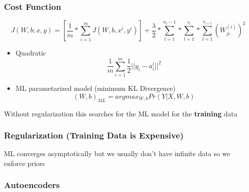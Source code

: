 \documentclass{beamer}
\begin{document}
\begin{frame}[fragile]
\frametitle{Cost Function}
	\begin{tiny}
		\begin{equation}
			J(W,b;x,y) = [\frac{1}{m}*\sum_{i=1}^{m} J(W,b,x^i,y^i)] + \frac{\lambda}{2}*\sum_{l=1}^{n_l-1}*\sum_{l=1}^{s_l}*\sum_{l=1}^{s_{l+1}}(W_{ji}^{(i)})^2
			\end{equation}
	\end{tiny}
	\normalsize
	\begin{itemize}
	\item 		
		Quadratic
		\begin{equation}
			\frac{1}{m}\sum_{i=1}^{m}\frac{1}{2}||y_i - a^l_i||^{2}
		\end{equation}
	\item 
		ML parametarized model (minimum KL Divergence)  \cite{ng2011sparse}
		\begin{equation}
			(W,b)_{ML} = argmax_{W,b}Pr(Y|X,W,b)
		\end{equation}
	\end{itemize}
	\begin{small}
		Without regularization this searches for the ML model for the \textbf{training} data 
		\cite{goodfellow2016deep}
	\end{small}
\end{frame}


\begin{frame}
	\frametitle{Regularization (Training Data is Expensive)}
	ML converges asymptotically but we usually don't have infinite data so we enforce priors
\end{frame}


\subsubsection{Autoencoders}

\end{document}
